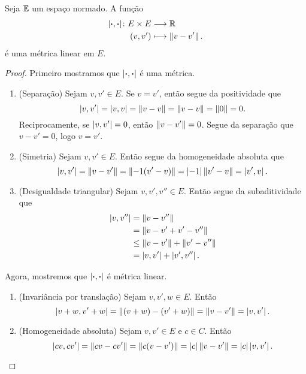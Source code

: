 \begin{proposition}
Seja $\mathbb{E}$ um espaço normado. A função
	\begin{align*}
	{\left\vert{\bm{\cdot}},{\bm{\cdot}}\right\vert}\colon {E \times E} &\longrightarrow {\mathbb{R}} \\{(v,v')} &\longmapsto \left\Vert{v - v'}\right\Vert.
	\end{align*}
é uma métrica linear em $E$.
\end{proposition}
\begin{proof}
Primeiro mostramos que $\left\vert{\bm{\cdot}},{\bm{\cdot}}\right\vert$ é uma métrica.
	\begin{enumerate}
	\item (Separação) Sejam $v,v' \in E$. Se $v = v'$, então segue da positividade que
	\begin{equation*}
	\left\vert{v},{v'}\right\vert = \left\vert{v},{v}\right\vert = \left\Vert{v - v}\right\Vert = \left\Vert{v-v}\right\Vert=\left\Vert{0}\right\Vert=0.
	\end{equation*}
Reciprocamente, se $\left\vert{v},{v'}\right\vert=0$, então $\left\Vert{v-v'}\right\Vert=0$. Segue da separação que $v-v'=0$, logo $v=v'$.

	\item (Simetria)  Sejam $v,v' \in E$. Então segue da homogeneidade absoluta que
	\begin{equation*}
	\left\vert{v},{v'}\right\vert=\left\Vert{v-v'}\right\Vert=\left\Vert{-1(v' - v)}\right\Vert=\left\vert{-1}\right\vert\left\Vert{v' - v}\right\Vert=\left\vert{v'},{v}\right\vert.
	\end{equation*}
	
	\item (Desigualdade triangular) Sejam $v,v',v'' \in E$. Então segue da subaditividade que
	\begin{align*}
	\left\vert{v},{v''}\right\vert &= \left\Vert{v-v''}\right\Vert \\
		&=\left\Vert{v-v'+v'-v''}\right\Vert \\
		&\leq \left\Vert{v-v'}\right\Vert+\left\Vert{v'-v''}\right\Vert \\
		&=\left\vert{v},{v'}\right\vert+\left\vert{v'},{v''}\right\vert.
	\end{align*}	
	\end{enumerate}
Agora, mostremos que $\left\vert{\bm{\cdot}},{\bm{\cdot}}\right\vert$ é métrica linear.
	\begin{enumerate}
	\item (Invariância por translação) Sejam $v,v',w \in E$. Então
		\begin{equation*}
		\left\vert{v+w},{v'+w}\right\vert = \left\Vert{(v+w) - (v'+w)}\right\Vert = \left\Vert{v-v'}\right\Vert = \left\vert{v},{v'}\right\vert.
		\end{equation*}
	
	\item (Homogeneidade absoluta) Sejam $v,v' \in E$ e $c \in C$. Então
		\begin{equation*}
		\left\vert{cv},{cv'}\right\vert = \left\Vert{cv-cv'}\right\Vert = \left\Vert{c(v-v')}\right\Vert = \left\vert{c}\right\vert\left\Vert{v-v'}\right\Vert = \left\vert{c}\right\vert\left\vert{v},{v'}\right\vert. \qedhere
		\end{equation*}
	\end{enumerate}
\end{proof}

